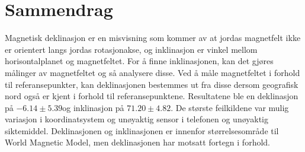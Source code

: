 
\section*{Sammendrag}

Magnetisk deklinasjon er en misvisning som kommer av at jordas magnetfelt ikke er orientert langs jordas 
rotasjonakse, og inklinasjon er vinkel mellom horisontalplanet og magnetfeltet. For å finne inklinasjonen, kan det gjøres målinger av magnetfeltet og så analysere disse. Ved å måle magnetfeltet i forhold til referansepunkter, kan 
deklinasjonen bestemmes ut fra disse dersom geografisk nord også er kjent i forhold til referansepunktene. Resultatene ble en deklinasjon på $-6.14\pm{5.39}$\textdegree og inklinasjon på 
$71.20\pm{4.82}$\textdegree. De største feilkildene var mulig variasjon i koordinatsystem og unøyaktig sensor i telefonen 
og unøyaktig siktemiddel. Deklinasjonen og inklinasjonen er innenfor størrelsesområde til World Magnetic Model, men 
deklinasjonen har motsatt fortegn i forhold.


